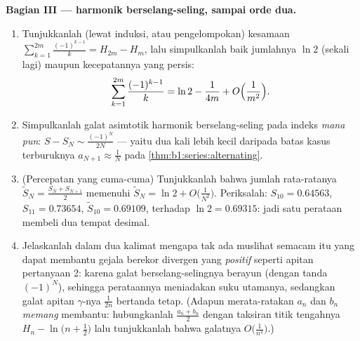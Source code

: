 \begin{problem}[{Soal akhir pekan --- $H_n = \ln n + \gamma +
\frac{1}{2n} + O(n^{-2})$, dan menyusun ulang $1 - \frac12 +
\frac13 - \dots$ menjadi $\frac{\ln 2}{2}$}]
\medskip
\noindent\textbf{Bagian III ---  harmonik berselang-seling,
sampai orde dua.}
\begin{enumerate}[resume]
  \item Tunjukkanlah (lewat induksi, atau pengelompokan) kesamaan
        $\sum_{k=1}^{2m} \frac{(-1)^{k-1}}{k} = H_{2m} - H_m$,
        lalu simpulkanlah baik jumlahnya $\ln 2$ (sekali lagi) maupun
        kecepatannya yang persis:
        \[
        \sum_{k=1}^{2m} \frac{(-1)^{k-1}}{k}
        = \ln 2 - \frac{1}{4m} + O\Bigl(\frac{1}{m^2}\Bigr) .
        \]
  \item Simpulkanlah galat asimtotik  harmonik
        berselang-seling pada indeks \emph{mana pun}: $S - S_N \sim
        \frac{(-1)^N}{2N}$ --- yaitu dua kali lebih kecil daripada batas kasus
        terburuknya $a_{N+1} \approx \frac1N$ pada
        \cref{thm:b1:series:alternating}.
  \item (Percepatan yang cuma-cuma) Tunjukkanlah bahwa jumlah rata-ratanya
        $\tilde S_N = \frac{S_N + S_{N+1}}{2}$ memenuhi $\tilde
        S_N = \ln 2 + O\bigl(\frac{1}{N^2}\bigr)$. Periksalah: $S_{10}
        = 0.64563$, $S_{11} = 0.73654$, $\tilde S_{10} =
        0.69109$, terhadap $\ln 2 = 0.69315$: jadi satu perataan membeli
        dua tempat desimal.
  \item Jelaskanlah dalam dua kalimat mengapa tak ada muslihat semacam itu yang dapat membantu
        gejala berekor divergen yang \emph{positif} seperti apitan pertanyaan
        2: karena galat berselang-selingnya berayun (dengan tanda
        $(-1)^N$), sehingga perataannya meniadakan suku utamanya, sedangkan
        galat apitan $\gamma$-nya $\frac{1}{2n}$ bertanda tetap.
        (Adapun merata-ratakan $a_n$ dan $b_n$ \emph{memang} membantu:
        hubungkanlah $\frac{a_n + b_n}{2}$ dengan taksiran titik tengahnya
        $H_n - \ln\bigl(n + \frac12\bigr)$ lalu tunjukkanlah bahwa galatnya
        $O\bigl(\frac{1}{n^2}\bigr)$.)
\end{enumerate}


\end{problem}
